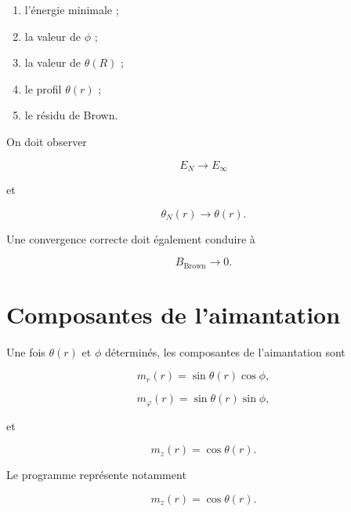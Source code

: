 \documentclass[a4paper,11pt]{article}
\begin{document}
\begin{enumerate}
    \item l'énergie minimale ;
    \item la valeur de $\phi$ ;
    \item la valeur de $\theta(R)$ ;
    \item le profil $\theta(r)$ ;
    \item le résidu de Brown.
\end{enumerate}

On doit observer

\begin{equation}
E_N\longrightarrow E_\infty
\end{equation}

et

\begin{equation}
\theta_N(r)
\longrightarrow
\theta(r).
\end{equation}

Une convergence correcte doit également conduire à

\begin{equation}
B_{\mathrm{Brown}}\longrightarrow0.
\end{equation}

\section{Composantes de l'aimantation}

Une fois $\theta(r)$ et $\phi$ déterminés, les composantes de l'aimantation
sont

\begin{equation}
\boxed{
m_r(r)
=
\sin\theta(r)\cos\phi,
}
\end{equation}

\begin{equation}
\boxed{
m_\varphi(r)
=
\sin\theta(r)\sin\phi,
}
\end{equation}

et

\begin{equation}
\boxed{
m_z(r)
=
\cos\theta(r).
}
\end{equation}

Le programme représente notamment

\begin{equation}
\boxed{
m_z(r)=\cos\theta(r).
}
\end{equation}
\end{document}
